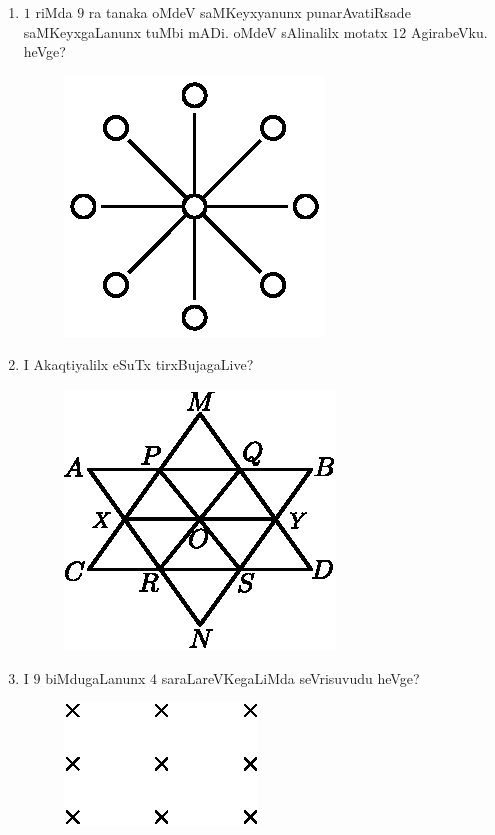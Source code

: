 \begin{enumerate}
\item $1$ riMda $9$ ra tanaka oMdeV saMKeyxyanunx punarAvatiRsade saMKeyxgaLanunx tuMbi mADi. oMdeV sAlinalilx motatx $12$ AgirabeVku. heVge?
\begin{figure}[H]
\centering
\includegraphics{src/figures/exr28.eps}
\end{figure}


\item I Akaqtiyalilx eSuTx tirxBujagaLive?
\begin{figure}[H]
\centering
\includegraphics{src/figures/exr29.eps}
\end{figure}

\eject

\item I $9$ biMdugaLanunx $4$ saraLareVKegaLiMda seVrisuvudu heVge?
\begin{figure}[H]
\centering
\includegraphics{src/figures/exr30.eps}
\end{figure}


\end{enumerate}
